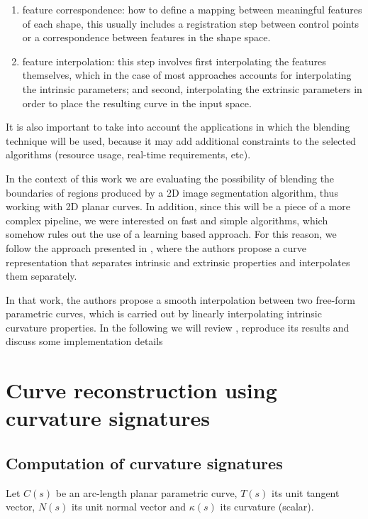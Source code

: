 \documentclass{ipol}
\begin{document}
\begin{enumerate}
\begin{enumerate}
            \item feature correspondence: how to define a mapping between meaningful features of each shape, this usually includes a registration step between control points or a correspondence between features in the shape space.
            \item feature interpolation: this step involves first interpolating the features themselves, which in the case of most approaches accounts for interpolating the intrinsic parameters; and second, interpolating the extrinsic parameters in order to  place the resulting curve in the input space.
        \end{enumerate}
\end{enumerate}

It is also important to take into account the applications in which the blending technique will be used, because it may add additional constraints to the selected algorithms  (resource usage, real-time requirements, etc).

In the context of this work we are evaluating the possibility of blending the boundaries of regions produced by a 2D image segmentation algorithm, thus working with 2D planar curves. In addition, since this will be a piece of a more complex pipeline, we were interested on fast and simple algorithms, which somehow rules out the use of a learning based approach.
For this reason, we follow the approach presented in \cite{im_proc:curve_interpolation:elber:07:metamorphosis_planar_parametric_curves}, where the authors propose a curve representation that separates intrinsic and extrinsic properties and interpolates them separately. 

In that work, the authors propose a smooth interpolation between two free-form parametric curves, which is carried out by linearly interpolating intrinsic curvature properties. In the following we will review \cite{im_proc:curve_interpolation:elber:07:metamorphosis_planar_parametric_curves}, reproduce its results and discuss some implementation details

\section{Curve reconstruction using curvature signatures}\label{sec:curve_interpolation:curve_reconstruction}
\subsection{Computation of curvature signatures}
Let $C(s)$ be an arc-length planar parametric curve, $T(s)$ its unit tangent vector, $N(s)$ its unit normal vector and $\kappa (s)$ its curvature (scalar).\\
\end{document}

